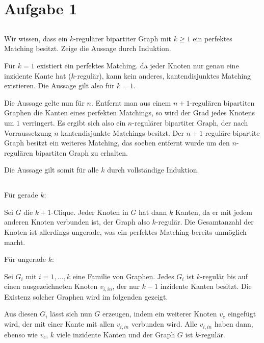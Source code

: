 \documentclass[a4paper]{article}
\begin{document}
\section{Aufgabe 1}
\subsection{}


\subsection{}
Wir wissen, dass ein $k$-regulärer bipartiter Graph mit $k \geq 1$ ein perfektes
Matching besitzt. Zeige die Aussage durch Induktion.

Für $k = 1$ existiert ein perfektes Matching. da jeder Knoten nur genau eine
inzidente Kante hat ($k$-regulär), kann kein anderes, kantendisjunktes
Matching existieren. Die Aussage gilt also für $k = 1$.

Die Aussage gelte nun für $n$.
Entfernt man aus einem $n+1$-regulären bipartiten Graphen die Kanten eines perfekten
Matchings, so wird der Grad jedes Knotens um $1$ verringert. Es ergibt sich
also ein $n$-regulärer bipartiter Graph, der nach Vorraussetzung $n$ kantendisjunkte
Matchings besitzt. Der $n+1$-reguläre bipartite Graph besitzt ein weiteres Matching,
das soeben entfernt wurde um den $n$-regulären bipartiten Graph zu erhalten.

Die Aussage gilt somit für alle $k$ durch vollständige Induktion.

\subsection{}
Für gerade $k$:

Sei $G$ die $k+1$-Clique. Jeder Knoten in $G$ hat dann $k$ Kanten, da er mit
jedem anderen Knoten verbunden ist, der Graph also $k$-regulär. Die 
Gesamtanzahl der Knoten ist allerdings ungerade, was ein perfektes Matching
bereits unmöglich macht.

Für ungerade $k$:

Sei $G_i$ mit $i = 1, ..., k$ eine Familie von Graphen.
Jedes $G_i$ ist $k$-regulär bis auf einen ausgezeichneten Knoten $v_{i,
in}$, der nur $k-1$ inzidente Kanten besitzt. Die Existenz solcher Graphen
wird im folgenden gezeigt.

Aus diesen $G_i$ lässt sich nun $G$ erzeugen, indem ein weiterer Knoten
$v_c$ eingefügt wird, der mit einer Kante mit allen $v_{i, in}$ verbunden
wird. Alle $v_{i, in}$ haben dann, ebenso wie $v_c$, $k$ viele inzidente
Kanten und der Graph $G$ ist $k$-regulär.
\end{document}

